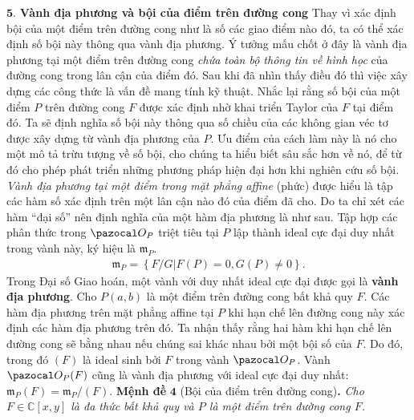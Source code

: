 \begin{multicols}{2}
	\vskip 0.1cm
	$\pmb{5.}$ \textbf{\color{duongvaotoanhoc}Vành địa phương và bội của điểm trên đường cong} 
	\vskip 0.1cm 
	Thay vì xác định bội của một điểm trên đường cong như là số các giao điểm nào đó, ta có thể xác định số bội này thông qua vành địa phương. Ý tưởng mấu chốt ở đây là vành địa phương tại một điểm trên đường cong {\em chứa toàn bộ thông tin về hình học} của đường cong trong lân cận của điểm đó. Sau khi đã nhìn thấy điều đó thì việc xây dựng các công thức là vấn đề mang tính kỹ thuật. 
	\vskip 0.1cm
	Nhắc lại rằng số bội của một điểm $P$ trên đường cong $F$ được xác định nhờ khai triển Taylor của $F$ tại điểm đó. Ta sẽ định nghĩa số bội này thông qua số chiều của các không gian véc tơ được xây dựng từ vành địa phương của $P$.  Ưu điểm của cách làm này là nó cho một mô tả trừu tượng về số bội, cho chúng ta hiểu biết sâu sắc hơn về nó, để từ đó cho phép phát triển những phương pháp hiện đại hơn khi nghiên cứu số bội. 
	\vskip 0.1cm
	{\em Vành địa phương tại một điểm trong mặt phẳng affine} (phức) được hiểu là tập các hàm số xác định trên một lân cận nào đó của điểm đã cho. Do ta chỉ xét các hàm ``đại số'' nên định nghĩa của một hàm địa phương là như sau.
	\vskip 0.2cm
	\vskip 0.2cm
	Tập hợp các phân thức trong $\pazocal O_P$ triệt tiêu tại $P$ lập thành ideal cực đại duy nhất trong vành này, ký hiệu là $\mathfrak m_P$. 
	\begin{align*}
		\mathfrak m_P=\left\{ F/G \left|\right.  F(P)=0, G(P)\neq 0\right\}.
	\end{align*}
	Trong Đại số Giao hoán, một vành với duy nhất ideal cực đại được gọi   là \textbf{\color{duongvaotoanhoc}vành địa phương}.
	\vskip 0.1cm
	Cho $P(a,b)$ là một điểm trên đường cong bất khả quy  $F$. Các hàm địa phương trên mặt phẳng affine tại $P$ khi hạn chế lên đường cong này xác định các hàm địa phương trên đó. Ta nhận thấy rằng hai hàm khi hạn chế lên đường cong sẽ bằng nhau nếu chúng sai khác nhau bởi một bội số của $F$. Do đó, 
	\vskip 0.2cm
	\vskip 0.2cm
	trong đó $(F)$ là ideal sinh bởi $F$ trong vành $\pazocal O_P$.
	Vành $\pazocal O_P(F)$ cũng là vành địa phương với ideal cực đại duy nhất:
	$\mathfrak m_P(F)=\mathfrak m_P/(F).$
	\vskip 0.1cm
	\textbf{\color{duongvaotoanhoc}Mệnh đề} $\pmb{4}$ (Bội của điểm trên đường cong)\textbf{\color{duongvaotoanhoc}.} 
		\textit{Cho $F\in\mathbb C[x,y]$ là đa thức bất khả quy và $P$ là một điểm trên đường cong $F$. 
}
\end{multicols}
